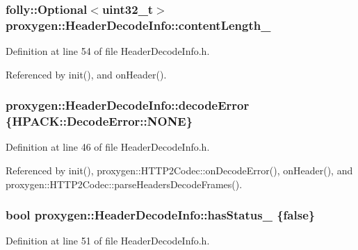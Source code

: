 \subsubsection[{content\+Length\+\_\+}]{\setlength{\rightskip}{0pt plus 5cm}folly\+::\+Optional$<$uint32\+\_\+t$>$ proxygen\+::\+Header\+Decode\+Info\+::content\+Length\+\_\+\hspace{0.3cm}{\ttfamily [private]}}\label{classproxygen_1_1HeaderDecodeInfo_ac4f8d4707ff340c762e102d181daf291}


Definition at line 54 of file Header\+Decode\+Info.\+h.



Referenced by init(), and on\+Header().

\subsubsection[{decode\+Error}]{ proxygen\+::\+Header\+Decode\+Info\+::decode\+Error \{{\bf H\+P\+A\+C\+K\+::\+Decode\+Error\+::\+N\+O\+NE}\}}\label{classproxygen_1_1HeaderDecodeInfo_a1ee0cd983100c8e34030b33f176c29e6}


Definition at line 46 of file Header\+Decode\+Info.\+h.



Referenced by init(), proxygen\+::\+H\+T\+T\+P2\+Codec\+::on\+Decode\+Error(), on\+Header(), and proxygen\+::\+H\+T\+T\+P2\+Codec\+::parse\+Headers\+Decode\+Frames().

\subsubsection[{has\+Status\+\_\+}]{\setlength{\rightskip}{0pt plus 5cm}bool proxygen\+::\+Header\+Decode\+Info\+::has\+Status\+\_\+ \{false\}\hspace{0.3cm}{\ttfamily [private]}}\label{classproxygen_1_1HeaderDecodeInfo_a66a48dd79098a7e71a04afcf5e3c3c2d}


Definition at line 51 of file Header\+Decode\+Info.\+h.



